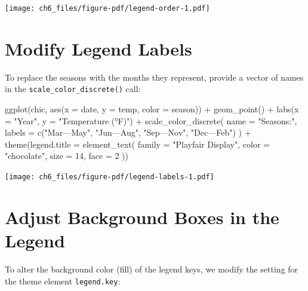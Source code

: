 \documentclass[
  letterpaper,
  DIV=11,
  numbers=noendperiod]{scrreprt}
\newenvironment{Shaded}{\begin{snugshade}}{\end{snugshade}}
\newcommand{\AttributeTok}[1]{\textcolor[rgb]{0.40,0.45,0.13}{#1}}
\newcommand{\DecValTok}[1]{\textcolor[rgb]{0.68,0.00,0.00}{#1}}
\newcommand{\FunctionTok}[1]{\textcolor[rgb]{0.28,0.35,0.67}{#1}}
\newcommand{\NormalTok}[1]{\textcolor[rgb]{0.00,0.23,0.31}{#1}}
\newcommand{\SpecialCharTok}[1]{\textcolor[rgb]{0.37,0.37,0.37}{#1}}
\newcommand{\StringTok}[1]{\textcolor[rgb]{0.13,0.47,0.30}{#1}}
\begin{document}
\texttt{[image: ch6\_files/figure-pdf/legend-order-1.pdf]}

\section{Modify Legend Labels}\label{modify-legend-labels}

To replace the seasons with the months they represent, provide a vector
of names in the \texttt{scale\_color\_discrete()} call:

\begin{Shaded}
\begin{Highlighting}[]
\FunctionTok{ggplot}\NormalTok{(chic, }\FunctionTok{aes}\NormalTok{(}\AttributeTok{x =}\NormalTok{ date, }\AttributeTok{y =}\NormalTok{ temp, }\AttributeTok{color =}\NormalTok{ season)) }\SpecialCharTok{+}
  \FunctionTok{geom\_point}\NormalTok{() }\SpecialCharTok{+}
  \FunctionTok{labs}\NormalTok{(}\AttributeTok{x =} \StringTok{"Year"}\NormalTok{, }\AttributeTok{y =} \StringTok{"Temperature (°F)"}\NormalTok{) }\SpecialCharTok{+}
  \FunctionTok{scale\_color\_discrete}\NormalTok{(}
    \AttributeTok{name =} \StringTok{"Seasons:"}\NormalTok{,}
    \AttributeTok{labels =} \FunctionTok{c}\NormalTok{(}\StringTok{"Mar—May"}\NormalTok{, }\StringTok{"Jun—Aug"}\NormalTok{, }\StringTok{"Sep—Nov"}\NormalTok{, }\StringTok{"Dec—Feb"}\NormalTok{)}
\NormalTok{  ) }\SpecialCharTok{+}
  \FunctionTok{theme}\NormalTok{(}\AttributeTok{legend.title =} \FunctionTok{element\_text}\NormalTok{(}
    \AttributeTok{family =} \StringTok{"Playfair Display"}\NormalTok{, }\AttributeTok{color =} \StringTok{"chocolate"}\NormalTok{, }\AttributeTok{size =} \DecValTok{14}\NormalTok{, }\AttributeTok{face =} \DecValTok{2}
\NormalTok{  ))}
\end{Highlighting}
\end{Shaded}

\texttt{[image: ch6\_files/figure-pdf/legend-labels-1.pdf]}

\section{Adjust Background Boxes in the
Legend}\label{adjust-background-boxes-in-the-legend}

To alter the background color (fill) of the legend keys, we modify the
setting for the theme element \texttt{legend.key}:
\end{document}
